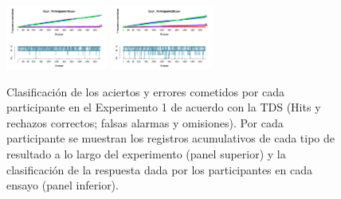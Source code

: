 \begin{figure}[th]
\includegraphics[width=0.30\textwidth]{Figures/Outcome_Exp1_P19} \includegraphics[width=0.30\textwidth]{Figures/Outcome_Exp1_P20} 
\caption[Resultados obtenidos por ensayo; Experimento 1]{Clasificación de los aciertos y errores cometidos por cada participante en el Experimento 1 de acuerdo con la TDS (Hits y rechazos correctos; falsas alarmas y omisiones). Por cada participante se muestran los registros acumulativos de cada tipo de resultado a lo largo del experimento (panel superior) y la clasificación de la respuesta dada por los participantes en cada ensayo (panel inferior).}
\label{fig:Outcome_E1}
\end{figure}

